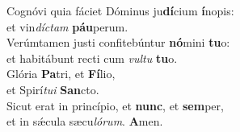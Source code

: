 \oddverse Cognóvi quia fáciet Dóminus ju\textbf{dí}cium \textbf{í}nopis:~\*\\
\oddverse et vin\textit{dí}\textit{ctam} \textbf{páu}perum.\\
\evenverse Verúmtamen justi confitebúntur \textbf{nó}mini \textbf{tu}o:~\*\\
\evenverse et habitábunt recti cum \textit{vul}\textit{tu} \textbf{tu}o.\\
\oddverse Glória \textbf{Pa}tri, et \textbf{Fí}lio,~\*\\
\oddverse et Spirí\textit{tu}\textit{i} \textbf{San}cto.\\
\evenverse Sicut erat in princípio, et \textbf{nunc}, et \textbf{sem}per,~\*\\
\evenverse et in sǽcula sæcu\textit{ló}\textit{rum}. \textbf{A}men.\\
